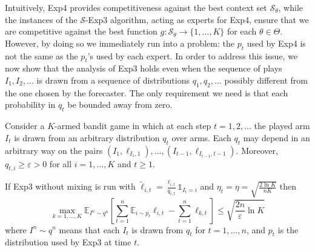 \documentclass[11pt]{hackednow}
\newcommand{\E}{\mathbb{E}}
\newcommand{\cS}{\mathcal{S}}
\def\ds1{\mathds{1}}
\renewcommand{\tilde}{\widetilde}
\newcommand{\ve}{\varepsilon}
\begin{document}
Intuitively, Exp4 provides competitiveness against the best context set $\cS_{\theta}$, while the instances of the $\cS$-Exp3 algorithm, acting as experts for Exp4, ensure that we are competitive against the best function $g : \cS_{\theta} \to \{1,\dots,K\}$ for each $\theta\in\Theta$. However, by doing so we immediately run into a problem: the $p_t$ used by Exp4 is not the same as the $p_t$'s used by each expert. In order to address this issue, we now show that the analysis of Exp3 holds even when the sequence of plays $I_1,I_2,\dots$ is drawn from a sequence of distributions $q_1,q_2,\dots$ possibly different from the one chosen by the forecaster. The only requirement we need is that each probability in $q_t$ be bounded away from zero.
\begin{theorem}
\label{th:exp3-rebel}
Consider a $K$-armed bandit game in which at each step $t=1,2,\dots$ the played arm $I_t$ is drawn from an arbitrary distribution $q_t$ over arms. Each $q_t$ may depend in an arbitrary way on the pairs $(I_1,\ell_{I_1,1}),\dots,(I_{t-1},\ell_{I_{t-1},t-1})$. Moreover, $q_{t,i} \ge \ve > 0$ for all $i=1,\dots,K$ and $t \ge 1$.

If Exp3 without mixing is run with $\tilde{\ell}_{i,t} = \frac{\ell_{i,t}}{q_{i,t}} \ds1_{I_t = i}$ and $\eta_t = \eta = \sqrt{\frac{2\ln K}{n K}}$ then
\begin{equation}
    \max_{k=1,\dots,K} \E_{I^n \sim q^n} \left[ \sum_{t=1}^n \E_{i \sim p_t} \ell_{i,t} - \sum_{t=1}^n \ell_{k,t} \right] \le
    \sqrt{\frac{2 n}{\ve}\ln K}
\end{equation}
where $I^n \sim q^n$ means that each $I_t$ is drawn from $q_t$ for $t=1,\dots,n$, and $p_t$ is the distribution used by Exp3 at time $t$.
\end{theorem}
\end{document}

